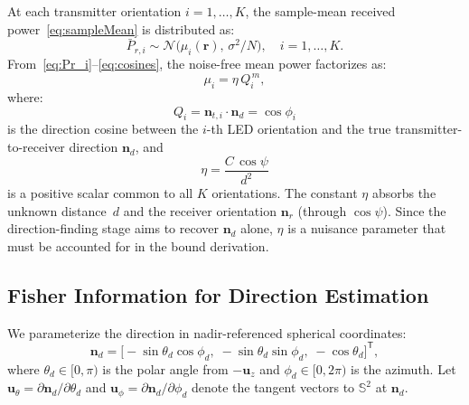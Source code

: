 \documentclass[journal]{IEEEtran}
\begin{document}
At each transmitter orientation $i=1,\ldots,K$, the sample-mean received power~\eqref{eq:sampleMean} is distributed as:
\begin{equation}
\bar P_{r,i} \sim 
  \mathcal{N}\!\bigl(\mu_{i}(\mathbf r),\,\sigma^{2}/N\bigr),
\quad i=1,\dots,K.
\end{equation}
From~\eqref{eq:Pr_i}--\eqref{eq:cosines}, the noise-free mean power factorizes as:
\begin{equation}
\mu_i = \eta\,Q_i^{\,m},
\label{eq:mu_factorized}
\end{equation}
where:
\begin{equation}
Q_i = \mathbf{n}_{t,i}\cdot\mathbf{n}_d = \cos\phi_i
\label{eq:Q}
\end{equation}
is the direction cosine between the $i$-th LED orientation and the true transmitter-to-receiver direction $\mathbf{n}_d$, and
\begin{equation}
\eta = \frac{C\,\cos\psi}{d^2}
\label{eq:eta_nuisance}
\end{equation}
is a positive scalar common to all $K$ orientations.  The constant $\eta$ absorbs the unknown distance~$d$ and the receiver orientation $\mathbf{n}_r$ (through $\cos\psi$).  Since the direction-finding stage aims to recover $\mathbf{n}_d$ alone, $\eta$ is a nuisance parameter that must be accounted for in the bound derivation.

\subsection{Fisher Information for Direction Estimation}
\label{subsec:FIM}

We parameterize the direction in nadir-referenced spherical coordinates:
\begin{equation}
\mathbf{n}_d = \bigl[-\sin\theta_d\cos\phi_d,\;-\sin\theta_d\sin\phi_d,\;-\cos\theta_d\bigr]^{\mathsf T},
\label{eq:nd_spherical}
\end{equation}
where $\theta_d\in[0,\pi)$ is the polar angle from $-\mathbf{u}_z$ and $\phi_d\in[0,2\pi)$ is the azimuth.  Let $\mathbf{u}_\theta = \partial\mathbf{n}_d/\partial\theta_d$ and $\mathbf{u}_\phi = \partial\mathbf{n}_d/\partial\phi_d$ denote the tangent vectors to $\mathbb{S}^2$ at $\mathbf{n}_d$.
\end{document}
